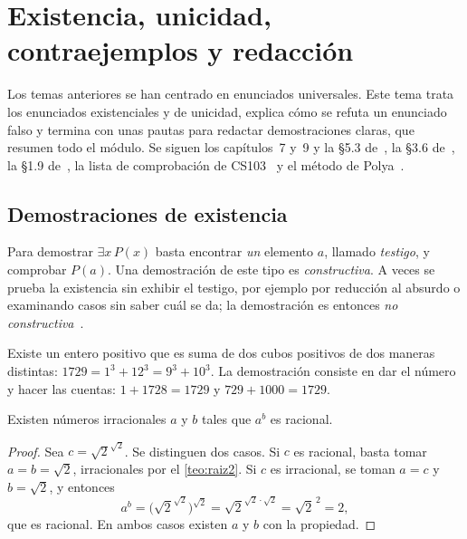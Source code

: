 \chapter{Existencia, unicidad, contraejemplos y redacción}
\label{tema:6}

Los temas anteriores se han centrado en enunciados universales. Este tema trata los enunciados existenciales y de unicidad, explica cómo se refuta un enunciado falso y termina con unas pautas para redactar demostraciones claras, que resumen todo el módulo. Se siguen los capítulos~7 y~9 y la §5.3 de~\cite{hammack}, la §3.6 de~\cite{velleman}, la §1.9 de~\cite{mcs}, la lista de comprobación de CS103~\cite{cs103} y el método de Polya~\cite{polya}.

\section{Demostraciones de existencia}

Para demostrar $\exists x\,P(x)$ basta encontrar \emph{un} elemento $a$, llamado \emph{testigo}, y comprobar $P(a)$. Una demostración de este tipo es \emph{constructiva}. A veces se prueba la existencia sin exhibir el testigo, por ejemplo por reducción al absurdo o examinando casos sin saber cuál se da; la demostración es entonces \emph{no constructiva}~\cite[§7.3–7.4]{hammack}.

\begin{ejemplo}\label{ej:1729}
Existe un entero positivo que es suma de dos cubos positivos de dos maneras distintas: $1729=1^{3}+12^{3}=9^{3}+10^{3}$. La demostración consiste en dar el número y hacer las cuentas: $1+1728=1729$ y $729+1000=1729$.
\end{ejemplo}

\begin{proposicion}\label{prop:irracional-potencia}
Existen números irracionales $a$ y $b$ tales que $a^{b}$ es racional.
\end{proposicion}

\begin{proof}
Sea $c=\sqrt2^{\sqrt2}$. Se distinguen dos casos. Si $c$ es racional, basta tomar $a=b=\sqrt2$, irracionales por el \cref{teo:raiz2}. Si $c$ es irracional, se toman $a=c$ y $b=\sqrt2$, y entonces
\[
a^{b}=\bigl(\sqrt2^{\sqrt2}\bigr)^{\sqrt2}=\sqrt2^{\sqrt2\cdot\sqrt2}=\sqrt2^{\,2}=2,
\]
que es racional. En ambos casos existen $a$ y $b$ con la propiedad.
\end{proof}

